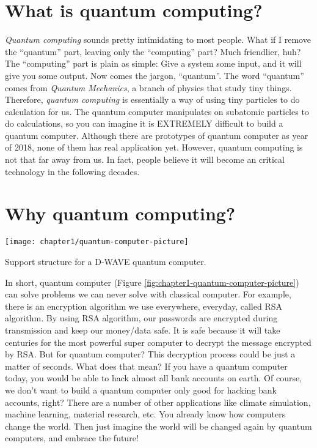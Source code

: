 \section{\textbf{What} is quantum computing?}

\begin{fullwidth}

\textit{Quantum computing} sounds pretty intimidating to most people. What if I remove the ``quantum'' part, leaving only the ``computing'' part? 
Much friendlier, huh? 
The ``computing'' part is plain as simple: Give a system some input, and it will give you some output. 
Now comes the jargon, ``quantum''. The word ``quantum'' comes from \textit{Quantum Mechanics}, a branch of physics that study tiny things. 
Therefore, \textit{quantum computing} is essentially a way of using tiny particles to do calculation for us.
The quantum computer manipulates on subatomic particles to do calculations, so you can imagine it is EXTREMELY difficult to build a quantum computer.
Although there are prototypes of quantum computer as year of 2018, none of them has real application yet.
However, quantum computing is not that far away from us.
In fact, people believe it will become an critical technology in the following decades.

\end{fullwidth}

\section{\textbf{Why} quantum computing?}

\begin{marginfigure}[15\baselineskip]
    \texttt{[image: chapter1/quantum-computer-picture]}
    \caption{Support structure for a D-WAVE quantum computer.}
    \label{fig:chapter1-quantum-computer-picture}
\end{marginfigure}

In short, quantum computer (Figure \ref{fig:chapter1-quantum-computer-picture}\cite{Chapter1-quantum-computer-picture}) can solve problems we can never solve with classical computer.
For example, there is an encryption algorithm we use everywhere, everyday, called RSA algorithm.
By using RSA algorithm, our passwords are encrypted during transmission and keep our money/data safe.
It is safe because it will take centuries for the most powerful super computer to decrypt the message encrypted by RSA.
But for quantum computer? This decryption process could be just a matter of seconds. 
What does that mean? If you have a quantum computer today, you would be able to hack almost all bank accounts on earth.
Of course, we don't want to build a quantum computer only good for hacking bank accounts, right?
There are a number of other applications like climate simulation, machine learning, material research, etc.
You already know how computers change the world.
Then just imagine the world will be changed again by quantum computers, and embrace the future!

